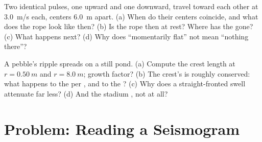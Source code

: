 \begin{exercise}[$\star\star\star$]\label{exo:g12:mechanical-waves:14}
Two identical pulses, one upward and one downward, travel toward each
other at \qty{3.0}{m/s} each, centers \qty{6.0}{m} apart. (a) When do
their centers coincide, and what does the rope look like then? (b) Is
the rope then at rest? Where has the  gone? (c) What happens
next? (d) Why does ``momentarily flat'' not mean ``nothing there''?
\end{exercise}

\begin{exercise}[$\star\star\star$]\label{exo:g12:mechanical-waves:15}
A pebble's ripple spreads on a still pond. (a) Compute the crest
length at $r = \qty{0.50}{m}$ and $r = \qty{8.0}{m}$; growth factor?
(b) The crest's  is roughly conserved: what happens to the
 per , and to the ? (c) Why does a straight-fronted
swell attenuate far less? (d) And the stadium , not at all?
\end{exercise}

\section{Problem: Reading a Seismogram}


